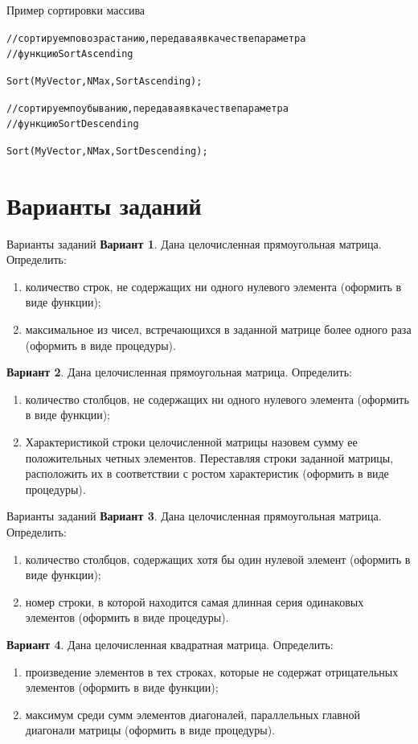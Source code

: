 \documentclass{beamer}
\begin{document}
\begin{frame}[fragile]{Пример сортировки массива}
\begin{alltt}
//сортируем по возрастанию, передавая в качестве параметра 
//функцию SortAscending

Sort(MyVector, NMax, SortAscending);

//сортируем по убыванию, передавая в качестве параметра 
//функцию SortDescending  

Sort(MyVector, NMax, SortDescending);
\end{alltt}
\end{frame}

\section{Варианты заданий}
\begin{frame}{Варианты заданий}
\textbf{Вариант 1}. Дана целочисленная прямоугольная матрица. Определить:
\begin{enumerate}
\item количество строк, не содержащих ни одного нулевого элемента (оформить в виде функции);
\item максимальное из чисел, встречающихся в заданной матрице более одного раза (оформить в виде процедуры).
\end{enumerate}
\textbf{Вариант 2}. Дана целочисленная прямоугольная матрица. Определить:
\begin{enumerate}
\item количество столбцов, не содержащих ни одного нулевого элемента (оформить в виде функции); 
\item Характеристикой строки целочисленной матрицы назовем сумму ее положительных четных элементов. Переставляя строки заданной матрицы, расположить их в соответствии с ростом характеристик (оформить в виде процедуры).
\end{enumerate}
\end{frame} 

\begin{frame}{Варианты заданий}
\textbf{Вариант 3}. Дана целочисленная прямоугольная матрица. Определить:
\begin{enumerate}
\item количество столбцов, содержащих хотя бы один нулевой элемент (оформить в виде функции);
\item номер строки, в которой находится самая длинная серия одинаковых элементов (оформить в виде процедуры).
\end{enumerate}
\textbf{Вариант 4}. Дана целочисленная квадратная матрица. Определить:
\begin{enumerate}
\item произведение элементов в тех строках, которые не содержат отрицательных элементов (оформить в виде функции); 
\item максимум среди сумм элементов диагоналей, параллельных главной диагонали матрицы (оформить в виде процедуры).
\end{enumerate}
\end{frame} 
\end{document}
